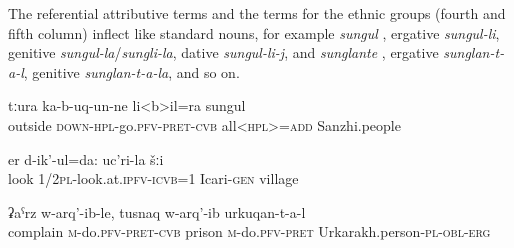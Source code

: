 The referential attributive terms and the terms for the ethnic groups (fourth and fifth column) inflect like standard nouns, for example \textit{sungul} , ergative \textit{sungul-li}, genitive \textit{sungul-la}\slash\textit{sungli-la}, dative \textit{sungul-li-j}, and \textit{sunglante} , ergative \textit{sunglan-t-a-l}, genitive \textit{sunglan-t-a-la}, and so on.
%
\begin{exe}
	\ex	\label{ex:All Sanzhi people came out (of their houses)}
	\gll	tːura	ka-b-uq-un-ne	li<b>il=ra	sungul\\
		outside	\textsc{down-hpl}-go.\textsc{pfv-pret-cvb}	all<\textsc{hpl>=add}	Sanzhi.people\\
	\glt  	{}

	\ex	\label{ex:We look: the village of Icari}
	\gll	er d-ik'-ul=da:	uc'ri-la	šːi  \\
		look 1/2\textsc{pl}-look.at.\textsc{ipfv-icvb}=1	Icari-\textsc{gen}	village\\
	\glt	{}

	\ex	\label{ex:The Urkarakh people complained and put him into prison}
	\gll	ʡaˁrz	w-arq'-ib-le,	tusnaq	w-arq'-ib	urkuqan-t-a-l   \\
		complain	\textsc{m-}do.\textsc{pfv-pret-cvb}	prison	\textsc{m}-do.\textsc{pfv-pret} Urkarakh.person-\textsc{pl-obl-erg}\\
	\glt	{}
\end{exe}


